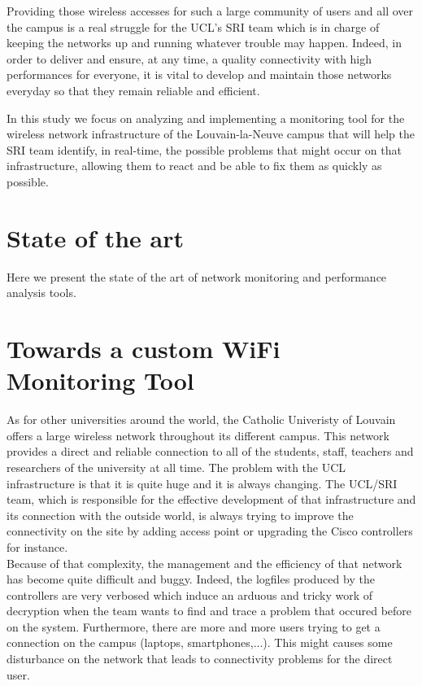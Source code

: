 Providing those wireless accesses for such a large community of users and all over the campus is a real struggle for the UCL's SRI team which is in charge of keeping the networks up and running whatever trouble may happen. Indeed, in order to deliver and ensure, at any time, a quality connectivity with high performances for everyone, it is vital to develop and maintain those networks everyday so that they remain reliable and efficient.
 
In this study we focus on analyzing and implementing a monitoring tool for the wireless network infrastructure of the Louvain-la-Neuve campus that will help the SRI team identify, in real-time, the possible problems that might occur on that infrastructure, allowing them to react and be able to fix them as quickly as possible.

\section{State of the art}
Here we present the state of the art of network monitoring and performance analysis tools.\\



\section{Towards a custom WiFi Monitoring Tool}
As for other universities around the world, the Catholic Univeristy of Louvain offers a large wireless network throughout its different campus. This network provides a direct and reliable connection to all of the students, staff, teachers and researchers of the university at all time. The problem with the UCL infrastructure is that it is quite huge and it is always changing. The UCL/SRI team, which is responsible for the effective development of that infrastructure and its connection with the outside world, is always trying to improve the connectivity on the site by adding access point or upgrading the Cisco controllers for instance.\\

Because of that complexity, the management and the efficiency of that network has become quite difficult and buggy. Indeed, the logfiles produced by the controllers are very verbosed which induce an arduous and tricky work of decryption when the team wants to find and trace a problem that occured before on the system. Furthermore, there are more and more users trying to get a connection on the campus (laptops, smartphones,...). This might causes some disturbance on the network that leads to connectivity problems for the direct user.\\

